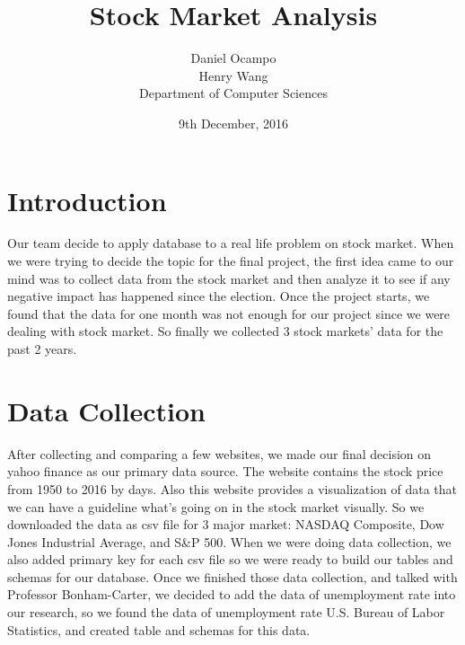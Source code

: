 \documentclass[12pt]{report}
\begin{document}
\title{Stock Market Analysis}

\author{
		Daniel Ocampo \\ 
		Henry Wang \\
		Department of Computer Sciences }
\date {
9th December, 2016
}
\maketitle
\tableofcontents
\newpage

\sectionfont{\scshape}


\section{Introduction}


Our team decide to apply database to a real life problem on stock market. When we were trying to decide the topic for the final project, the first idea came to our mind was to collect data from the stock market and then analyze it to see if any negative impact has happened since the election. Once the project starts, we found that the data for one month was not enough for our project since we were dealing with stock market. So finally we collected 3 stock markets' data for the past 2 years.    
\section{Data Collection}
After collecting and comparing a few websites, we made our final decision on yahoo finance as our primary data source. The website contains the stock price from 1950 to 2016 by days. Also this website provides a visualization of data that we can have a guideline what's going on in the stock market visually. So we downloaded the data as csv file for 3 major market: NASDAQ Composite, Dow Jones Industrial Average, and S\&P 500.  When we were doing data collection, we also added primary key for each csv file so we were ready to build our tables and schemas for our database. Once we finished those data collection, and talked with Professor Bonham-Carter, we decided to add the data of unemployment rate into our research, so we found the data of unemployment rate U.S. Bureau of Labor Statistics, and created table and schemas for this data.
\end{document}
